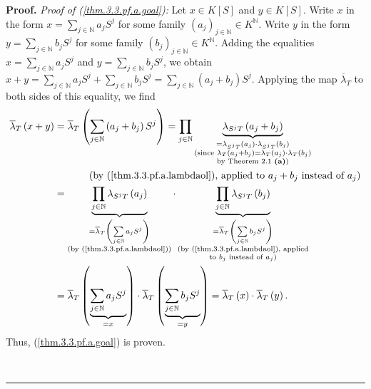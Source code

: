 \documentclass[numbers=enddot,12pt,final,onecolumn,notitlepage]{scrartcl}%
\newenvironment{proof}[1][Proof]{\noindent\textbf{#1.} }{\ \rule{0.5em}{0.5em}}
\begin{document}
\begin{proof}
\textit{Proof of (\ref{thm.3.3.pf.a.goal}):} Let $x\in K\left[  S\right]  $
and $y\in K\left[  S\right]  $. Write $x$ in the form $x=\sum\limits_{j\in
\mathbb{N}}a_{j}S^{j}$ for some family $\left(  a_{j}\right)  _{j\in
\mathbb{N}}\in K^{\mathbb{N}}$. Write $y$ in the form $y=\sum\limits_{j\in
\mathbb{N}}b_{j}S^{j}$ for some family $\left(  b_{j}\right)  _{j\in
\mathbb{N}}\in K^{\mathbb{N}}$. Adding the equalities $x=\sum\limits_{j\in
\mathbb{N}}a_{j}S^{j}$ and $y=\sum\limits_{j\in\mathbb{N}}b_{j}S^{j}$, we
obtain $x+y=\sum\limits_{j\in\mathbb{N}}a_{j}S^{j}+\sum\limits_{j\in
\mathbb{N}}b_{j}S^{j}=\sum\limits_{j\in\mathbb{N}}\left(  a_{j}+b_{j}\right)
S^{j}$. Applying the map $\overline{\lambda}_{T}$ to both sides of this
equality, we find%
\begin{align*}
\overline{\lambda}_{T}\left(  x+y\right)   &  =\overline{\lambda}_{T}\left(
\sum\limits_{j\in\mathbb{N}}\left(  a_{j}+b_{j}\right)  S^{j}\right)
=\prod\limits_{j\in\mathbb{N}}\underbrace{\lambda_{S^{j}T}\left(  a_{j}%
+b_{j}\right)  }_{\substack{=\lambda_{S^{j}T}\left(  a_{j}\right)
\cdot\lambda_{S^{j}T}\left(  b_{j}\right)  \\\text{(since }\lambda_{T}\left(
a_{j}+b_{j}\right)  =\lambda_{T}\left(  a_{j}\right)  \cdot\lambda_{T}\left(
b_{j}\right)  \\\text{by Theorem 2.1 \textbf{(a)})}}}\\
&  \ \ \ \ \ \ \ \ \ \ \left(  \text{by (\ref{thm.3.3.pf.a.lambdaol}), applied
to }a_{j}+b_{j}\text{ instead of }a_{j}\right) \\
&  =\underbrace{\prod\limits_{j\in\mathbb{N}}\lambda_{S^{j}T}\left(
a_{j}\right)  }_{\substack{=\overline{\lambda}_{T}\left(  \sum\limits_{j\in
\mathbb{N}}a_{j}S^{j}\right)  \\\text{(by (\ref{thm.3.3.pf.a.lambdaol}))}%
}}\cdot\underbrace{\prod\limits_{j\in\mathbb{N}}\lambda_{S^{j}T}\left(
b_{j}\right)  }_{\substack{=\overline{\lambda}_{T}\left(  \sum\limits_{j\in
\mathbb{N}}b_{j}S^{j}\right)  \\\text{(by (\ref{thm.3.3.pf.a.lambdaol}),
applied}\\\text{to }b_{j}\text{ instead of }a_{j}\text{)}}}\\
&  =\overline{\lambda}_{T}\left(  \underbrace{\sum\limits_{j\in\mathbb{N}%
}a_{j}S^{j}}_{=x}\right)  \cdot\overline{\lambda}_{T}\left(  \underbrace{\sum
\limits_{j\in\mathbb{N}}b_{j}S^{j}}_{=y}\right)  =\overline{\lambda}%
_{T}\left(  x\right)  \cdot\overline{\lambda}_{T}\left(  y\right)  .
\end{align*}
Thus, (\ref{thm.3.3.pf.a.goal}) is proven.


\end{proof}
\end{document}
